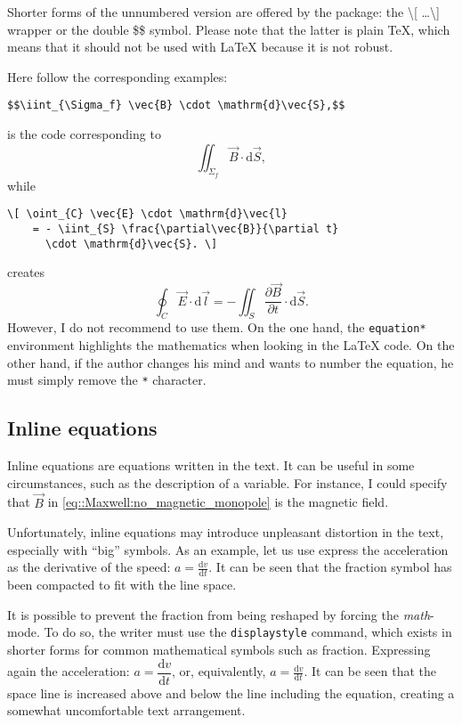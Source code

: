 		Shorter forms of the unnumbered version are offered by the package: the \textbackslash [ \ldots \textbackslash ] wrapper or the double \$\$ symbol.
		Please note that the latter is plain \TeX{}, which means that it should not be used with LaTeX because it is not robust.
		
		Here follow the corresponding examples:
\begin{lstlisting}[language={[LaTeX]TeX}]
$$\iint_{\Sigma_f} \vec{B} \cdot \mathrm{d}\vec{S},$$
\end{lstlisting}
		is the code corresponding to
		$$ \iint_{\Sigma_f} \vec{B} \cdot \mathrm{d}\vec{S}, $$
		while
\begin{lstlisting}[language={[LaTeX]TeX}]
\[ \oint_{C} \vec{E} \cdot \mathrm{d}\vec{l}
	= - \iint_{S} \frac{\partial\vec{B}}{\partial t}
	  \cdot \mathrm{d}\vec{S}. \]
\end{lstlisting}
		creates
		\[ \oint_{C} \vec{E} \cdot \mathrm{d}\vec{l}
			= - \iint_{S} \frac{\partial\vec{B}}{\partial t}
			  \cdot \mathrm{d}\vec{S}. \]
		However, I do not recommend to use them. 
		On the one hand, the \texttt{equation*} environment highlights the mathematics when looking in the \LaTeX{} code.
		On the other hand, if the author changes his mind and wants to number the equation, he must simply remove the \texttt{*} character.
	
	
	\subsection{Inline equations}
	
		Inline equations are equations written in the text.
		It can be useful in some circumstances, such as the description of a variable.
		For instance, I could specify that $\vec{B}$ in \cref{eq::Maxwell:no_magnetic_monopole} is the magnetic field.
		
		Unfortunately, inline equations may introduce unpleasant distortion in the text, especially with \enquote{big} symbols.
		As an example, let us use express the acceleration as the derivative of the speed:
		$a=\frac{\mathrm{d}v}{\mathrm{d}t}$.
		It can be seen that the fraction symbol has been compacted to fit with the line space.
		
		It is possible to prevent the fraction from being reshaped by forcing the \textit{math}-mode.
		To do so, the writer must use the \texttt{displaystyle} command, which exists in shorter forms for common mathematical symbols such as fraction.
		Expressing again the acceleration:
		$a=\dfrac{\mathrm{d}v}{\mathrm{d}t}$, or, equivalently,
		$\displaystyle a=\frac{\mathrm{d}v}{\mathrm{d}t}$.
		It can be seen that the space line is increased above and below the line including the equation, creating a somewhat uncomfortable text arrangement.
		
